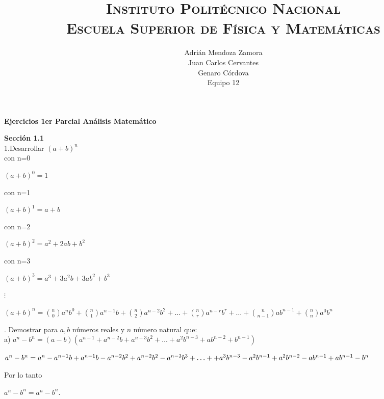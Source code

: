 \documentclass[12pt,a4paper,scrartcl]{article}
\title{	
\normalfont \normalsize 
\textsc{Instituto Polit\'ecnico Nacional\\
Escuela Superior de F\'isica y Matem\'aticas} \\
}
\author{Adri\'an Mendoza Zamora\\
Juan Carlos Cervantes\\
Genaro C\'ordova \\
Equipo 12}
\begin{document}
\maketitle

{\textbf{{Ejercicios 1er Parcial  An\'alisis Matem\'atico }}

\textbf{Secci\'on 1.1}\\

1.Desarrollar $(a+b)^n$\\

con n=0\\
\begin{center}
$(a+b)^0=1$
\end{center}

con n=1\\
\begin{center}
$(a+b)^1=a+b$
\end{center}

con n=2\\
\begin{center}
$(a+b)^2=a^2+2ab+b^2$
\end{center}

con n=3\\
\begin{center}
$(a+b)^3=a^3+3a^2b+3ab^2+b^3$
\end{center}

\begin{center}
$\vdots$
\end{center}

\begin{center}
$(a+b)^n=\binom{n}{0}a^nb^0+\binom{n}{1}a^{n-1}b+\binom{n}{2}a^{n-2}b^2+\dots+\binom{n}{r}a^{n-r}b^r+\dots+\binom{n}{n-1}ab^{n-1}+\binom{n}{n}a^0b^n$
\end{center}





. Demostrar para $a,b$ n\'umeros reales y $n$ n\'umero natural que:\\

a) 
$a^n-b^n = (a-b)(a^{n-1}+a^{n-2}b+a^{n-3}b^2+ \hdots +a^{2}b^{n-3}+ab^{n-2}+b^{n-1}) $\linebreak
\begin{center}
$a^n-b^n=a^n-a^{n-1}b+a^{n-1}b-a^{n-2}b^2+a^{n-2}b^2-a^{n-3}b^3+\ldots+\linebreak+a^3b^{n-3}-a^{2}b^{n-1}+a^2b^{n-2}-ab^{n-1}+ab^{n-1}-b^n$
\end{center}
Por lo tanto \\
\begin{center}
$a^n-b^n=a^n-b^n$.
\end{center}
\vspace{5em}

}
\end{document}
